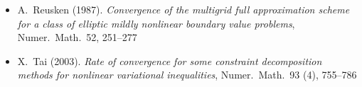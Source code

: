 \begin{itemize}
\item A.~Reusken (1987). \emph{Convergence of the multigrid full approximation scheme for a class of elliptic mildly nonlinear boundary value problems}, Numer.~Math.~52, 251--277 
\item X.~Tai (2003). \emph{Rate of convergence for some constraint decomposition methods for nonlinear variational inequalities}, Numer.~Math.~93 (4), 755--786 
\end{itemize}

